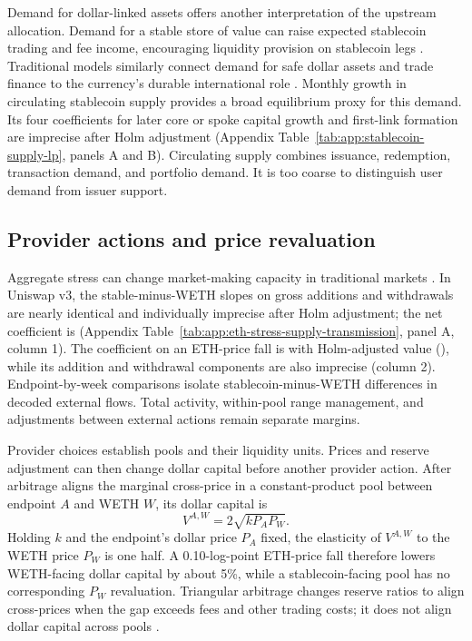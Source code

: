 Demand for dollar-linked assets offers another interpretation of the upstream allocation. Demand for a stable store of value can raise expected stablecoin trading and fee income, encouraging liquidity provision on stablecoin legs \citep{CataliniDeGortariShah2022Stablecoins,LyonsViswanathNatraj2023Stablecoins}. Traditional models similarly connect demand for safe dollar assets and trade finance to the currency's durable international role \citep{GopinathStein2021Making,ChahrourValchev2022TradeFinance}. Monthly growth in circulating stablecoin supply provides a broad equilibrium proxy for this demand. Its four coefficients for later core or spoke capital growth and first-link formation are imprecise after Holm adjustment (Appendix Table~\ref{tab:app:stablecoin-supply-lp}, panels A and B). Circulating supply combines issuance, redemption, transaction demand, and portfolio demand. It is too coarse to distinguish user demand from issuer support.

\subsection{Provider actions and price revaluation}
\label{sec:liquidity:eth-accounting}

Aggregate stress can change market-making capacity in traditional markets \citep{BrunnermeierPedersen2009Liquidity,Nagel2012EvaporatingLiquidity}. In Uniswap v3, the stable-minus-WETH slopes on gross additions and withdrawals are nearly identical and individually imprecise after Holm adjustment; the net coefficient is \EthStressVThreeNetSupplyVolatilityEffect{} (Appendix Table~\ref{tab:app:eth-stress-supply-transmission}, panel A, column 1). The coefficient on an ETH-price fall is \EthStressVThreeNetSupplyDeclineEffect{} with Holm-adjusted value (\EthStressVThreeNetSupplyDeclineHolmValue{}), while its addition and withdrawal components are also imprecise (column 2). Endpoint-by-week comparisons isolate stablecoin-minus-WETH differences in decoded external flows. Total activity, within-pool range management, and adjustments between external actions remain separate margins.

Provider choices establish pools and their liquidity units. Prices and reserve adjustment can then change dollar capital before another provider action. After arbitrage aligns the marginal cross-price in a constant-product pool between endpoint $A$ and WETH $W$, its dollar capital is
\[
V^{A,W}=2\sqrt{kP_A P_W}.
\]
Holding $k$ and the endpoint's dollar price $P_A$ fixed, the elasticity of $V^{A,W}$ to the WETH price $P_W$ is one half. A 0.10-log-point ETH-price fall therefore lowers WETH-facing dollar capital by about 5\%, while a stablecoin-facing pool has no corresponding $P_W$ revaluation. Triangular arbitrage changes reserve ratios to align cross-prices when the gap exceeds fees and other trading costs; it does not align dollar capital across pools \citep{DaianEtAl2020FlashBoys}.

